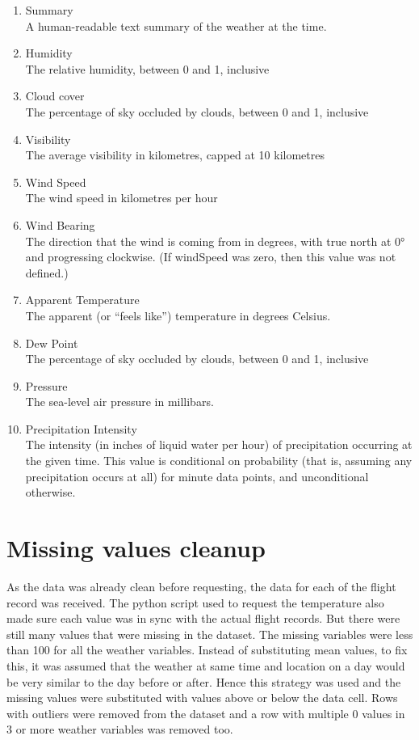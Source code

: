 \begin{enumerate}
    \item Summary
    \\A human-readable text summary of the weather at the time.
    \item Humidity
    \\The relative humidity, between 0 and 1, inclusive
    \item Cloud cover
    \\The percentage of sky occluded by clouds, between 0 and 1, inclusive
    \item Visibility
    \\The average visibility in kilometres, capped at 10 kilometres
    \item Wind Speed
    \\The wind speed in kilometres per hour
    \item Wind Bearing
    \\The direction that the wind is coming from in degrees, with true north at 0° and progressing clockwise. (If windSpeed was zero, then this value was not defined.)
    \item Apparent Temperature
    \\The apparent (or “feels like”) temperature in degrees Celsius.
    \item Dew Point
    \\The percentage of sky occluded by clouds, between 0 and 1, inclusive
    \item Pressure
    \\The sea-level air pressure in millibars.
    \item Precipitation Intensity
    \\The intensity (in inches of liquid water per hour) of precipitation occurring at the given time. This value is conditional on probability (that is, assuming any precipitation occurs at all) for minute data points, and unconditional otherwise.
\end{enumerate}

\section{Missing values cleanup}
As the data was already clean before requesting, the data for each of the flight record was received. The python script used to request the temperature also made sure each value was in sync with the actual flight records.
But there were still many values that were missing in the dataset. The missing variables were less than 100 for all the weather variables. Instead of substituting mean values, to fix this, it was assumed that the weather at same time and location on a day would be very similar to the day before or after. Hence this strategy was used and the missing values were substituted with values above or below the data cell. Rows with outliers were removed from the dataset and a row with multiple 0 values in 3 or more weather variables was removed too.